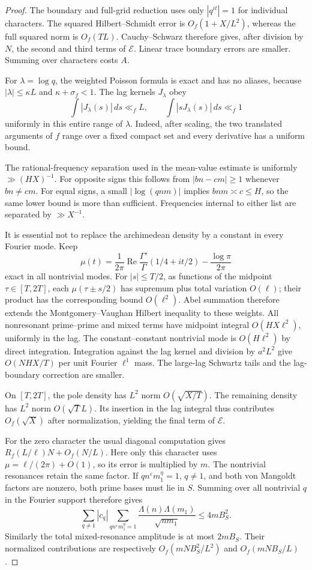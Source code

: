 \documentclass[11pt,letterpaper]{article}
\theoremstyle{definition}
\theoremstyle{remark}
\renewcommand{\Re}{\operatorname{Re}}
\newcommand{\1}{\mathbf 1}
\begin{document}
\begin{proof}
The boundary and full-grid reduction uses only $|q^{it}|=1$ for
individual characters. The squared Hilbert--Schmidt error is
$O_f(1+X/L^2)$, whereas the full squared norm is $O_f(TL)$.
Cauchy--Schwarz therefore gives, after division by $N$, the second
and third terms of $\mathcal E$. Linear trace boundary errors are
smaller. Summing over characters costs $A$.

For $\lambda=\log q$, the weighted Poisson formula is exact and has
no aliases, because $|\lambda|\le\kappa L$ and
$\kappa+\sigma_f<1$. The lag kernels $J_\lambda$ obey
\[
 \int|J_\lambda(s)|\,ds\ll_f L,\qquad
 \int|sJ_\lambda(s)|\,ds\ll_f1
\]
uniformly in this entire range of $\lambda$. Indeed, after scaling,
the two translated arguments of $f$ range over a fixed compact set
and every derivative has a uniform bound.

The rational-frequency separation used in the mean-value estimate
is uniformly $\gg(HX)^{-1}$. For opposite signs this follows from
$|bn-cm|\ge1$ whenever $bn\ne cm$. For equal signs, a small
$|\log(qnm)|$ implies $bnm\asymp c\le H$, so the same lower bound
is more than sufficient. Frequencies internal to either list are
separated by $\gg X^{-1}$.

It is essential not to replace the archimedean density by a constant
in every Fourier mode. Keep
\[
 \mu(t)=\frac1{2\pi}\Re\frac{\Gamma'}\Gamma(1/4+it/2)
               -\frac{\log\pi}{2\pi}
\]
exact in all nontrivial modes. For $|s|\le T/2$, as functions of
the midpoint $\tau\in[T,2T]$, each $\mu(\tau\pm s/2)$ has
supremum plus total variation $O(\ell)$; their product has the
corresponding bound $O(\ell^2)$. Abel summation therefore extends
the Montgomery--Vaughan Hilbert inequality to these weights.
All nonresonant prime--prime and mixed terms have midpoint integral
$O(HX\ell^2)$, uniformly in the lag. The constant--constant
nontrivial mode is $O(H\ell^2)$ by direct integration.
Integration against the lag kernel and division by $a^2L^2$
give $O(NHX/T)$ per unit Fourier $\ell^1$ mass. The large-lag
Schwartz tails and the lag-boundary correction are smaller.

On $[T,2T]$, the pole density has $L^2$ norm $O(\sqrt{X/T})$.
The remaining density has $L^2$ norm $O(\sqrt T L)$. Its insertion
in the lag integral thus contributes $O_f(\sqrt X)$ after
normalization, yielding the final term of $\mathcal E$.

For the zero character the usual diagonal computation gives
$R_f(L/\ell)N+O_f(N/L)$. Here only this character uses
$\mu=\ell/(2\pi)+O(1)$, so its error is multiplied by $m$.
The nontrivial resonances retain the same factor. If
$q n^{\varepsilon}m_1^{\eta}=1$, $q\ne1$, and both von Mangoldt
factors are nonzero, both prime bases must lie in $S$. Summing
over all nontrivial $q$ in the Fourier support therefore gives
\[
 \sum_{q\ne1}|c_q|
 \sum_{qn^{\varepsilon}m_1^{\eta}=1}
 \frac{\Lambda(n)\Lambda(m_1)}{\sqrt{nm_1}}
 \le 4mB_S^2.
\]
Similarly the total mixed-resonance amplitude is at most $2mB_S$.
Their normalized contributions are respectively
$O_f(mNB_S^2/L^2)$ and $O_f(mNB_S/L)$.


\end{proof}
\end{document}
